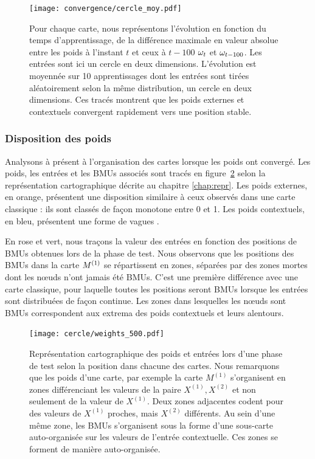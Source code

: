 \documentclass[../main]{subfiles}
\begin{document}
\begin{figure}[h!]
	\texttt{[image: convergence/cercle\_moy.pdf]}
	\caption{Pour chaque carte, nous représentons l'évolution en fonction du temps d'apprentissage, de la différence maximale en valeur absolue entre les poids à l'instant $t$ et ceux à $t-100$ $\omega_t$ et $\omega_{t-100}$. Les entrées sont ici un cercle en deux dimensions. L'évolution est moyennée sur 10 apprentissages dont les entrées sont tirées aléatoirement selon la même distribution, un cercle en deux dimensions.
	Ces tracés montrent que les poids externes et contextuels convergent rapidement vers une position stable.\label{fig:conv}}
\end{figure}


\subsubsection{Disposition des poids}

Analysons à présent à l'organisation des cartes lorsque les poids ont convergé.
Les poids, les entrées et les BMUs associés sont tracés en figure~\ref{fig:w} selon la représentation cartographique décrite au chapitre \ref{chap:repr}.
Les poids externes, en orange, présentent une disposition similaire à ceux observés dans une carte classique : ils sont classés de façon monotone entre 0 et 1.
Les poids contextuels, en bleu, présentent une forme de \og vagues \fg{}. 

En rose et vert, nous traçons la valeur des entrées en fonction des positions de BMUs obtenues lors de la phase de test.
Nous observons que les positions des BMUs dans la carte $M^{({1})}$ se répartissent en zones, séparées par des zones mortes dont les n\oe{}uds n'ont jamais été BMUs. C'est une première différence avec une carte classique, pour laquelle toutes les positions seront BMUs lorsque les entrées sont distribuées de façon continue.
Les zones dans lesquelles les n\oe{}uds sont BMUs correspondent aux extrema des poids contextuels et leurs alentours.

\begin{figure}[ht!]
	\centering\texttt{[image: cercle/weights\_500.pdf]}
	\caption{Représentation cartographique des poids et entrées lors d'une phase de test selon la position dans chacune des cartes. Nous remarquons que les poids d'une carte, par exemple la carte $M^{(1)}$ s'organisent en zones différenciant les valeurs de la paire $X^{(1)}, X^{(2)}$ et non seulement de la valeur de $X^{(1)}$. Deux zones adjacentes codent pour des valeurs de $X^{(1)}$ proches, mais $X^{(2)}$ différents. Au sein d'une même zone, les BMUs s'organisent sous la forme d'une sous-carte auto-organisée sur les valeurs de l'entrée contextuelle. Ces zones se forment de manière auto-organisée. \label{fig:w}}
\end{figure}
\end{document}

